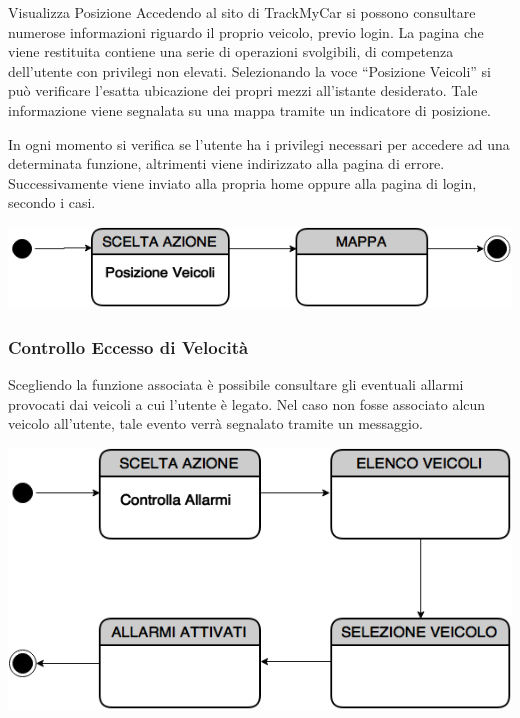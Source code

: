 \documentclass[a4paper,12pt]{beamer}
\begin{document}
\begin{frame}{Visualizza Posizione}
Accedendo al sito di TrackMyCar si possono consultare numerose informazioni riguardo il proprio veicolo, previo login. La pagina che viene restituita contiene una serie di operazioni svolgibili, di competenza dell'utente con privilegi non elevati. Selezionando la voce ``Posizione Veicoli'' si può verificare l'esatta ubicazione dei propri mezzi all'istante desiderato. Tale informazione viene segnalata su una mappa tramite un indicatore di posizione. 

In ogni momento si verifica se l'utente ha i privilegi necessari per accedere ad una determinata funzione, altrimenti viene indirizzato alla pagina di errore. Successivamente viene inviato alla propria home oppure alla pagina di login, secondo i casi.

\begin{center}
\includegraphics[scale=0.3]{../UseCase/Posizione.png}
\end{center}
\end{frame}

\begin{frame}
\frametitle{Controllo Eccesso di Velocità}
Scegliendo la funzione associata è possibile consultare gli eventuali allarmi provocati dai veicoli a cui l'utente è legato. Nel caso non fosse associato alcun veicolo all'utente, tale evento verrà segnalato tramite un messaggio. 

\begin{center}
\includegraphics[scale=0.3]{../UseCase/Allarmi.png}
\end{center}
\end{frame}
\end{document}
